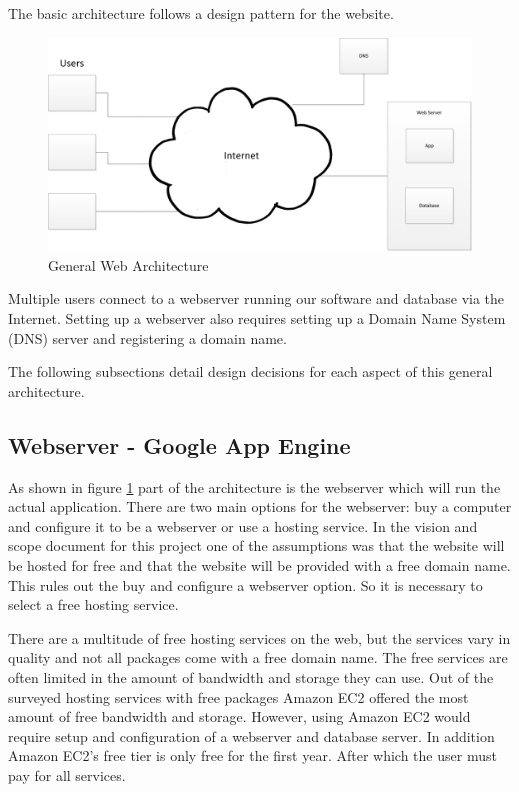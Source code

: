 \documentclass{article}
\begin{document}
The basic architecture follows a design pattern for the website.

\FloatBarrier
\begin{figure}[h!]
\centering
\includegraphics[scale=.6]{img/generalWebArchitecture}
\caption{General Web Architecture}
\label{fig:generalWebArchitecture}
\end{figure}
\FloatBarrier

Multiple users connect to a webserver running our software and database via the Internet.
Setting up a webserver also requires setting up a Domain Name System (DNS) server and registering a domain
name.

The following subsections detail design decisions for each aspect of this general architecture.

\subsection{Webserver - Google App Engine}

As shown in figure \ref{fig:generalWebArchitecture} part of the architecture is the webserver which will run the actual application. There are two main options
for the webserver: buy a computer and configure it to be a webserver or use a hosting service. In the vision and scope document for this project
one of the assumptions was that the website will be hosted for free and that the website will be provided with a free
domain name. \cite{schwab_apo_2012} This rules out the buy and configure a webserver option. So it is necessary to select a free hosting service.

There are a multitude of free hosting services on the web, but the services vary in quality and not all packages
come with a free domain name. The free services are often limited in the amount of bandwidth and storage they can use.
Out of the surveyed hosting services with free packages Amazon EC2 offered the most amount of free bandwidth and storage. \cite{amazon_amazon_2012} \cite{heroku_heroku_2012} \cite{google_quotas_2012} However, using Amazon EC2 would require setup and configuration of a webserver and database server. In addition Amazon EC2's free tier is only free for the first year. After which the user must pay for all services.
\end{document}
